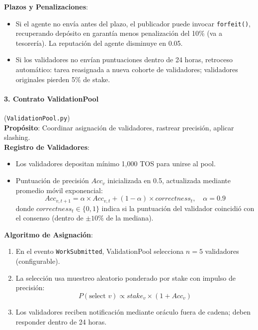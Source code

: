 \documentclass[11pt]{article}
\begin{document}
\textbf{Plazos y Penalizaciones}:
\begin{itemize}[noitemsep]
  \item Si el agente no envía antes del plazo, el publicador puede invocar \texttt{forfeit()}, recuperando depósito en garantía menos penalización del 10\% (va a tesorería). La reputación del agente disminuye en 0.05.
  \item Si los validadores no envían puntuaciones dentro de 24 horas, retroceso automático: tarea reasignada a nueva cohorte de validadores; validadores originales pierden 5\% de stake.
\end{itemize}

\paragraph{3. Contrato ValidationPool} (\texttt{ValidationPool.py})\\
\textbf{Propósito}: Coordinar asignación de validadores, rastrear precisión, aplicar slashing.\\
\textbf{Registro de Validadores}:
\begin{itemize}[noitemsep]
  \item Los validadores depositan mínimo 1,000 TOS para unirse al pool.
  \item Puntuación de precisión $Acc_v$ inicializada en 0.5, actualizada mediante promedio móvil exponencial:
    \begin{equation}
    Acc_{v,t+1} = \alpha \times Acc_{v,t} + (1-\alpha) \times correctness_t, \quad \alpha = 0.9
    \end{equation}
    donde $correctness_t \in \{0,1\}$ indica si la puntuación del validador coincidió con el consenso (dentro de $\pm10\%$ de la mediana).
\end{itemize}
\textbf{Algoritmo de Asignación}:
\begin{enumerate}[noitemsep]
  \item En el evento \texttt{WorkSubmitted}, ValidationPool selecciona $n=5$ validadores (configurable).
  \item La selección usa muestreo aleatorio ponderado por stake con impulso de precisión:
    \begin{equation}
    P(\text{select } v) \propto stake_v \times (1 + Acc_v)
    \end{equation}
  \item Los validadores reciben notificación mediante oráculo fuera de cadena; deben responder dentro de 24 horas.
\end{enumerate}
\end{document}
